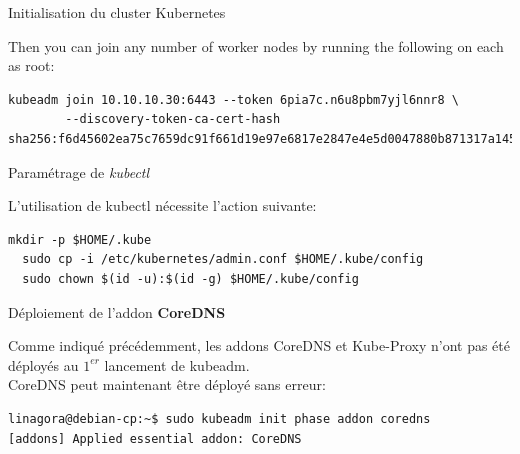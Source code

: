 \begin{frame}[shrink=7,fragile]{Initialisation du cluster Kubernetes}
\begin{toile}
Then you can join any number of worker nodes by running the following on each as root:

\begin{tiny}
\begin{Verbatim}[commandchars=\&\@\@]
kubeadm join 10.10.10.30:6443 --token 6pia7c.n6u8pbm7yjl6nnr8 \
        --discovery-token-ca-cert-hash sha256:f6d45602ea75c7659dc91f661d19e97e6817e2847e4e5d0047880b871317a145 
\end{Verbatim}
\end{tiny}

\end{toile}

\end{frame}


\begin{frame}[fragile]{Paramétrage de \textit{kubectl}}

   L'utilisation de kubectl nécessite l'action suivante:

\begin{tiny}
\begin{Verbatim}[commandchars=\&\@\@]
  mkdir -p $HOME/.kube
  sudo cp -i /etc/kubernetes/admin.conf $HOME/.kube/config
  sudo chown $(id -u):$(id -g) $HOME/.kube/config
\end{Verbatim}
\end{tiny}

\end{frame}


\begin{frame}[fragile]{Déploiement de l'addon \textbf{CoreDNS}}

   Comme indiqué précédemment, les addons CoreDNS et Kube-Proxy n'ont pas été déployés au $1^{er}$ lancement de kubeadm.\\
   CoreDNS peut maintenant être déployé sans erreur:\\

\begin{tiny}
\begin{Verbatim}[commandchars=\\\{\}]
linagora@debian-cp:~$ sudo kubeadm init phase addon coredns
[addons] Applied essential addon: CoreDNS
\end{Verbatim}
\end{tiny}

\end{frame}

